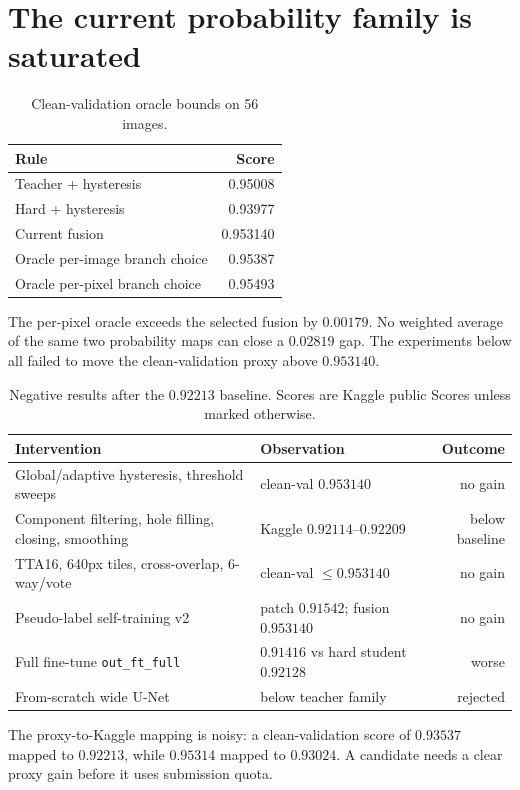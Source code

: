 \documentclass[10pt]{article}
\begin{document}
\section{The current probability family is saturated}
\label{sec:saturation}
\begin{table}[htbp]\centering\footnotesize
\caption{Clean-validation oracle bounds on 56 images.}
\begin{tabular}{lr}
\toprule Rule & Score \\
\midrule
Teacher + hysteresis & 0.95008 \\
Hard + hysteresis & 0.93977 \\
Current fusion & 0.953140 \\
Oracle per-image branch choice & 0.95387 \\
Oracle per-pixel branch choice & 0.95493 \\
\bottomrule
\end{tabular}
\end{table}
The per-pixel oracle exceeds the selected fusion by $0.00179$. No weighted average of the same two probability maps can close a $0.02819$ gap. The experiments below all failed to move the clean-validation proxy above $0.953140$.
\begin{table}[htbp]\centering\footnotesize
\caption{Negative results after the $0.92213$ baseline. Scores are Kaggle public Scores unless marked otherwise.}
\begin{tabular}{llr}
\toprule Intervention & Observation & Outcome \\
\midrule
Global/adaptive hysteresis, threshold sweeps & clean-val $0.953140$ & no gain \\
Component filtering, hole filling, closing, smoothing & Kaggle $0.92114$--$0.92209$ & below baseline \\
TTA16, 640px tiles, cross-overlap, 6-way/vote & clean-val $\le 0.953140$ & no gain \\
Pseudo-label self-training v2 & patch $0.91542$; fusion $0.953140$ & no gain \\
Full fine-tune \texttt{out\_ft\_full} & $0.91416$ vs hard student $0.92128$ & worse \\
From-scratch wide U-Net & below teacher family & rejected \\
\bottomrule
\end{tabular}
\end{table}
The proxy-to-Kaggle mapping is noisy: a clean-validation score of $0.93537$ mapped to $0.92213$, while $0.95314$ mapped to $0.93024$. A candidate needs a clear proxy gain before it uses submission quota.
\end{document}
